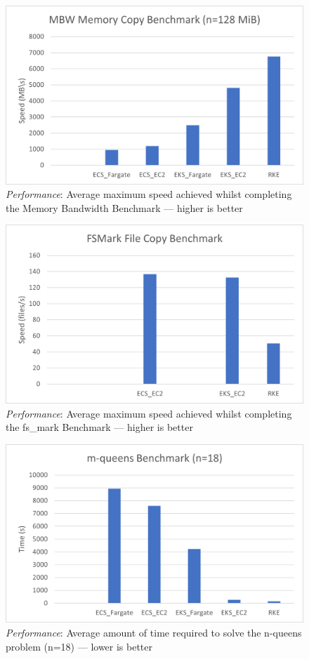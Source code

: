 \begin{figure}[hp]
  \includegraphics{images/perf-MBW.png}
  \caption{\emph{Performance}: Average maximum speed achieved whilst completing the Memory Bandwidth Benchmark --- higher is better}
  \label{fig:perf_MBW}
\end{figure}

\begin{figure}[hp]
  \includegraphics{images/perf-FSMark.png}
  \caption{\emph{Performance}: Average maximum speed achieved whilst completing the fs\_mark Benchmark --- higher is better}
  \label{fig:perf_FSMark}
\end{figure}

\begin{figure}[hp]
  \includegraphics{images/perf-m_queens.png}
  \caption{\emph{Performance}: Average amount of time required to solve the n-queens problem (n=18) --- lower is better}
  \label{fig:perf_mQueens}
\end{figure}

